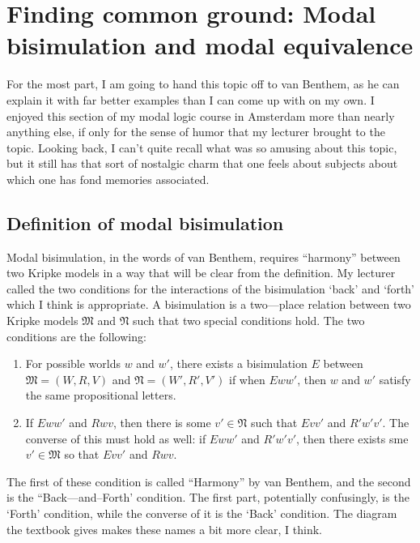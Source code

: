 \chapter[Two equivalence notions]{Finding common ground: Modal bisimulation and modal equivalence}

For the most part, I am going to hand this topic off to van Benthem, as he can explain it with far better examples than I can come
up with on my own. I enjoyed this section of my modal logic course in Amsterdam more than nearly anything else, if only
for the sense of humor that my lecturer brought to the topic. Looking back, I can't quite recall what was so amusing about this
topic, but it still has that sort of nostalgic charm that one feels about subjects about which one has fond memories associated.

\setcounter{section}{-1}

\section{Definition of modal bisimulation}
Modal bisimulation, in the words of van Benthem, requires ``harmony'' between two Kripke models in a way that will be clear from
the definition. My lecturer called the two conditions for the interactions of the bisimulation `back' and `forth' which I think
is appropriate. A bisimulation is a two---place relation between two Kripke models $\mathfrak{M}$ and $\mathfrak{N}$ such that
two special conditions hold.
The two conditions are the following:

\begin{enumerate}
    \item For possible worlds $w$ and $w'$, there exists a bisimulation $E$ between $\mathfrak{M}=(W, R, V)$ and $\mathfrak{N}=(W', R', V')$ if when $Eww'$,
    then $w$ and $w'$ satisfy the same propositional letters.
    \item If $Eww'$ and $Rwv$, then there is some $v' \in \mathfrak{N}$ such that $Evv'$ and $R'w'v'$. The converse of this must hold 
    as well: if $Eww'$ and $R'w'v'$, then there exists sme $v' \in \mathfrak{M}$ so that $Evv'$ and $Rwv$. 
\end{enumerate}

The first of these condition is called ``Harmony'' by van Benthem, and the second is the ``Back---and--Forth' condition. The 
first part, potentially confusingly, is the `Forth' condition, while the converse of it is the `Back' condition. The diagram 
the textbook gives makes these names a bit more clear, I think. 

